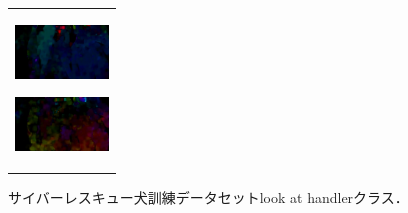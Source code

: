 \begin{enumerate}
\begin{end}
\begin{figure}[H]
\begin{tabular}{l}
\begin{minipage}{0.165\hsize}
        \begin{center}
          \includegraphics[clip, width=2.5cm]{./Figures/optic_look4.eps}
          \hspace{0.1cm} { }
        \end{center}
      \end{minipage}
      \begin{minipage}{0.165\hsize}
        \begin{center}
          \includegraphics[clip, width=2.5cm]{./Figures/optic_look5.eps}
          \hspace{2.2cm} { }
        \end{center}
      \end{minipage}
    \end{tabular}
    \caption{サイバーレスキュー犬訓練データセットlook at handlerクラス．}
    \label{lookathandler}
\end{figure}

\begin{figure}[H]
    \begin{tabular}{l}


\end{tabular}
\end{figure}
\end{end}
\end{enumerate}
